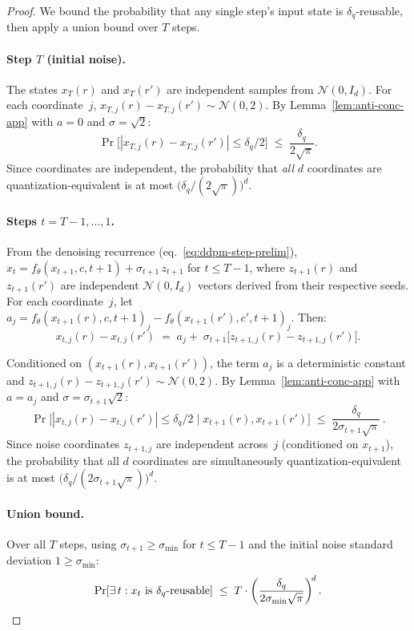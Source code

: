 \begin{proof}
We bound the probability that any single step's input state is $\delta_q$-reusable, then apply a union bound over $T$ steps.

\paragraph{Step $T$ (initial noise).}
The states $x_T(r)$ and $x_T(r')$ are independent samples from $\mathcal{N}(0, I_d)$. For each coordinate~$j$, $x_{T,j}(r) - x_{T,j}(r') \sim \mathcal{N}(0, 2)$. By Lemma~\ref{lem:anti-conc-app} with $a = 0$ and $\sigma = \sqrt{2}$:
\[
    \Pr\!\bigl[|x_{T,j}(r) - x_{T,j}(r')| \leq \delta_q/2\bigr] \;\leq\; \frac{\delta_q}{2\sqrt{\pi}}.
\]
Since coordinates are independent, the probability that \emph{all} $d$ coordinates are quantization-equivalent is at most $\bigl(\delta_q/(2\sqrt{\pi})\bigr)^d$.

\paragraph{Steps $t = T{-}1, \ldots, 1$.}
From the denoising recurrence (eq.~\eqref{eq:ddpm-step-prelim}), $x_t = f_\theta(x_{t+1}, c, t{+}1) + \sigma_{t+1}\, z_{t+1}$ for $t \leq T{-}1$, where $z_{t+1}(r)$ and $z_{t+1}(r')$ are independent $\mathcal{N}(0, I_d)$ vectors derived from their respective seeds. For each coordinate~$j$, let $a_j = f_\theta(x_{t+1}(r), c, t{+}1)_j - f_\theta(x_{t+1}(r'), c', t{+}1)_j$. Then:
\[
x_{t,j}(r) - x_{t,j}(r') \;=\; a_j 
    +\; \sigma_{t+1}\bigl[z_{t+1,j}(r) - z_{t+1,j}(r')\bigr].
\]

Conditioned on $(x_{t+1}(r), x_{t+1}(r'))$, the term $a_j$ is a deterministic constant and $z_{t+1,j}(r) - z_{t+1,j}(r') \sim \mathcal{N}(0, 2)$. By Lemma~\ref{lem:anti-conc-app} with $a = a_j$ and $\sigma = \sigma_{t+1}\sqrt{2}$:
\[
    \Pr\!\bigl[|x_{t,j}(r) - x_{t,j}(r')| \leq \delta_q/2 \;\big|\; x_{t+1}(r), x_{t+1}(r')\bigr] \;\leq\; \frac{\delta_q}{2\sigma_{t+1}\sqrt{\pi}}\,.
\]
Since noise coordinates $z_{t+1,j}$ are independent across~$j$ (conditioned on $x_{t+1}$), the probability that all $d$ coordinates are simultaneously quantization-equivalent is at most $\bigl(\delta_q/(2\sigma_{t+1}\sqrt{\pi})\bigr)^d$.

\paragraph{Union bound.}
Over all $T$ steps, using $\sigma_{t+1} \geq \sigma_{\min}$ for $t \leq T{-}1$ and the initial noise standard deviation $1 \geq \sigma_{\min}$:
\[
    \Pr[\exists\, t : x_t \text{ is } \delta_q\text{-reusable}] \;\leq\; T \cdot \left(\frac{\delta_q}{2\sigma_{\min}\sqrt{\pi}}\right)^{\!d}. \qedhere
\]
\end{proof}


